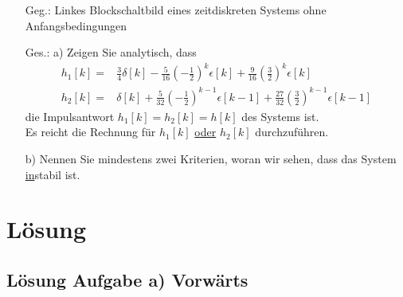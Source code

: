 \documentclass[11pt,a4paper,DIV=12]{scrartcl}
\begin{document}
%
\quad
\begin{minipage}{0.5\textwidth}
	\begin{itemize}
		\item[Geg.:] Linkes Blockschaltbild eines zeitdiskreten Systems ohne Anfangsbedingungen
		\item[Ges.: a)] Zeigen Sie analytisch, dass
		\begin{align*}
			h_1[k] =& \frac{3}{4} \delta[k] - \frac{5}{16}\left(-\frac{1}{2}\right)^k \epsilon[k] + \frac{9}{16}\left(\frac{3}{2}\right)^k \epsilon[k]\\
			h_2[k] =& \delta[k] + \frac{5}{32}\left(-\frac{1}{2}\right)^{k-1} \epsilon[k-1] + \frac{27}{32}\left(\frac{3}{2}\right)^{k-1} \epsilon[k-1]
		\end{align*}
		die Impulsantwort $h_1[k]=h_2[k]=h[k]$ des Systems ist.\\
		Es reicht die Rechnung für $h_1[k]$ \underline{oder} $h_2[k]$ durchzuführen.
		\item[      b)] Nennen Sie mindestens zwei Kriterien, woran wir sehen, dass das System \underline{in}stabil ist.
	\end{itemize}
\end{minipage}
\quad
\newpage
%
\section*{Lösung}
%
%
%
\subsection*{Lösung Aufgabe a) Vorwärts}
\end{document}
